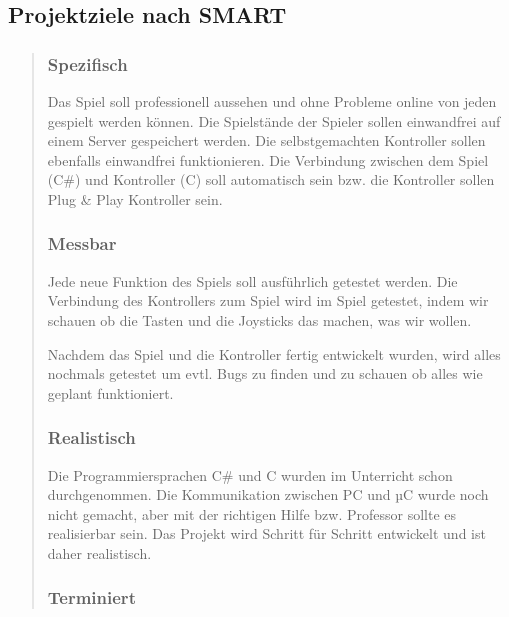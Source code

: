 \hypertarget{projektziele-nach-smart}{%
\subsection{Projektziele nach SMART}\label{projektziele-nach-smart}}
\begin{quote}

\hypertarget{spezifisch}{%
\subsubsection{Spezifisch}\label{spezifisch}}

Das Spiel soll professionell aussehen und ohne Probleme online von jeden
gespielt werden können. Die Spielstände der Spieler sollen einwandfrei
auf einem Server gespeichert werden. Die selbstgemachten Kontroller
sollen ebenfalls einwandfrei funktionieren. Die Verbindung zwischen dem
Spiel (C\#) und Kontroller (C) soll automatisch sein bzw. die Kontroller
sollen Plug \& Play Kontroller sein.

\hypertarget{messbar}{
\subsubsection{Messbar}\label{messbar}}

Jede neue Funktion des Spiels soll ausführlich getestet werden. Die
Verbindung des Kontrollers zum Spiel wird im Spiel getestet, indem wir
schauen ob die Tasten und die Joysticks das machen, was wir wollen.

Nachdem das Spiel und die Kontroller fertig entwickelt wurden, wird
alles nochmals getestet um evtl. Bugs zu finden und zu schauen ob alles
wie geplant funktioniert.

\subsubsection{Realistisch}\label{realistisch}

Die Programmiersprachen C\# und C wurden im Unterricht schon
durchgenommen. Die Kommunikation zwischen PC und µC wurde noch nicht
gemacht, aber mit der richtigen Hilfe bzw. Professor sollte es
realisierbar sein. Das Projekt wird Schritt für Schritt entwickelt und
ist daher realistisch.

\hypertarget{terminiert}{%
\subsubsection{Terminiert}\label{terminiert}}



\end{quote}
